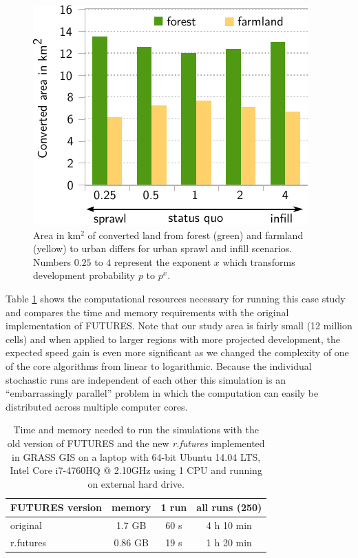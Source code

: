 \documentclass{isprs}
\begin{document}
\begin{figure}[!ht]
 \centering
 \includegraphics[width=0.9\columnwidth]{./figures/converted_land_new.pdf}
 \caption{Area in km$^2$ of converted land from forest (green) and farmland (yellow) to urban
 differs for urban sprawl and infill scenarios. Numbers $0.25$ to $4$ represent the exponent $x$ which
 transforms development probability $p$ to $p^x$.}
 \label{fig:results_plot}
\end{figure}


Table \ref{tab:benchmark} shows the computational resources
necessary for running this case study and compares 
the time and memory requirements with the original
implementation of FUTURES. Note that
our study area is fairly small (12 million cells)
and when applied to larger regions with more projected development, 
the expected speed gain is even more significant
as we changed the complexity of one of the core algorithms from linear to logarithmic.
Because the individual stochastic runs are independent of each other
this simulation is an
``embarrassingly parallel''  problem \cite{herlihy2012art}
in which the computation can easily be distributed across multiple computer cores.

\begin{table}[htp]
 \centering
\begin{center}
\begin{tabular}{lccc}
\toprule
FUTURES version & memory & 1 run & all runs (250)\\ \midrule
original & 1.7 GB & 60 s & 4 h 10 min\\
r.futures  & 0.86 GB & 19 s & 1 h 20 min\\
\bottomrule
\end{tabular}
\end{center}
 \caption{Time and memory needed to run the simulations
 with the old version of FUTURES and the new  \emph{r.futures}
 implemented in GRASS GIS on a laptop with 64-bit Ubuntu 14.04 LTS,
 Intel Core i7-4760HQ $@$ 2.10GHz using 1 CPU and running on external hard drive.}
 \label{tab:benchmark}
\end{table}
\end{document}

